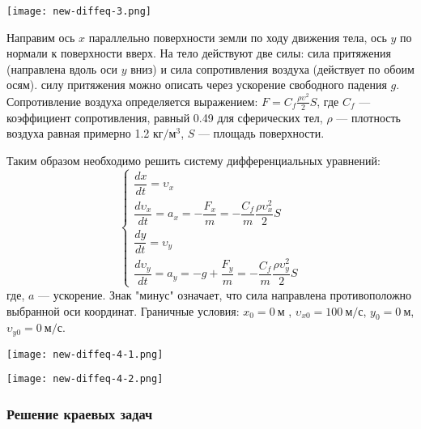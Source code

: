 \begin{center}
	\texttt{[image: new-diffeq-3.png]}
\end{center}



Направим ось $x$ параллельно поверхности земли по ходу движения тела, ось $y$ по нормали к поверхности вверх. На тело действуют две силы: сила притяжения (направлена вдоль оси $y$ вниз) и сила сопротивления воздуха (действует по обоим осям). силу притяжения можно описать через ускорение свободного падения $g$. Сопротивление воздуха определяется выражением: $F=C_f \frac{\rho \upsilon^2}{2} S$, где $C_f$ --- коэффициент сопротивления, равный 0.49 для сферических тел, $\rho$ --- плотность воздуха равная примерно 1.2 $кг/м^3$, $S$ --- площадь поверхности.

Таким образом необходимо решить систему дифференциальных уравнений:
\begin{equation*}
\begin{cases}
\dfrac{dx}{dt}=\upsilon_x  \\
\dfrac{d \upsilon_x}{dt} = a_x = -\dfrac{F_x}{m}=-\dfrac{C_f}{m} \dfrac{\rho \upsilon_x^2}{2}S \\
\dfrac{dy}{dt}=\upsilon_y  \\
\dfrac{d \upsilon_y}{dt} = a_y = -g+\dfrac{F_y}{m}=-\dfrac{C_f}{m} \dfrac{\rho \upsilon_y^2}{2}S
\end{cases}
\end{equation*}
где, $a$ --- ускорение. Знак "минус" означает, что сила направлена противоположно выбранной оси координат. Граничные условия: $x_0=0~м$ , $\upsilon_{x0}=100~м/с$, $y_0=0~ м$, $\upsilon_{y0}=0~ м/с$.

\begin{center}
	\texttt{[image: new-diffeq-4-1.png]}
\end{center}
\begin{center}
	\texttt{[image: new-diffeq-4-2.png]}
\end{center}
\subsubsection*{Решение краевых задач}

